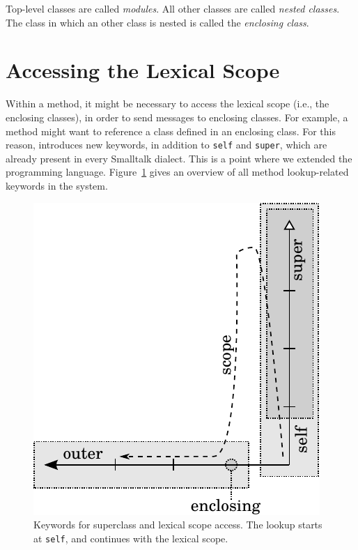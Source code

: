 Top-level classes are called \emph{modules}. All other classes are called \emph{nested classes}. The class in which an other class is nested is called the \emph{enclosing class}.


\section{Accessing the Lexical Scope}
Within a method, it might be necessary to access the lexical scope (i.e., the enclosing classes), in order to send messages to enclosing classes. For example, a method might want to reference a class defined in an enclosing class. For this reason, \msname introduces new keywords, in addition to \texttt{self} and \texttt{super}, which are already present in every Smalltalk dialect. This is a point where we extended the programming language. Figure~\ref{fig:concept_keywords} gives an overview of all method lookup-related keywords in the system.

\begin{figure}[!htp]
	\centering
	\includegraphics[scale=1]{lookup_keywords.pdf}
	\caption[Keywords for superclass and lexical scope access]{Keywords for superclass and lexical scope access. The lookup starts at \texttt{self}, and continues with the lexical scope.}
	\label{fig:concept_keywords}
\end{figure}

